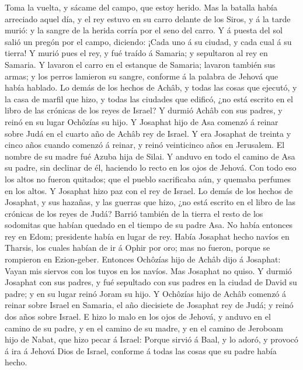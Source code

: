 Toma la vuelta, y sácame del campo, que estoy herido. 
Mas la batalla había arreciado aquel día, y el rey estuvo en su carro
delante de los Siros, y á la tarde murió: y la sangre de la herida
corría por el seno del carro.  Y á puesta del sol salió
un pregón por el campo, diciendo: ¡Cada uno á su ciudad, y cada cual á
su tierra!  Y murió pues el rey, y fué traído á Samaria;
y sepultaron al rey en Samaria.  Y lavaron el carro en el
estanque de Samaria; lavaron también sus armas; y los perros lamieron su
sangre, conforme á la palabra de Jehová que había hablado.
 Lo demás de los hechos de Achâb, y todas las cosas que
ejecutó, y la casa de marfil que hizo, y todas las ciudades que edificó,
¿no está escrito en el libro de las crónicas de los reyes de Israel?
 Y durmió Achâb con sus padres, y reinó en su lugar
Ochôzías su hijo.  Y Josaphat hijo de Asa comenzó á
reinar sobre Judá en el cuarto año de Achâb rey de Israel.
 Y era Josaphat de treinta y cinco años cuando comenzó á
reinar, y reinó veinticinco años en Jerusalem. El nombre de su madre fué
Azuba hija de Silai.  Y anduvo en todo el camino de Asa
su padre, sin declinar de él, haciendo lo recto en los ojos de Jehová.
 Con todo eso los altos no fueron quitados; que el pueblo
sacrificaba aún, y quemaba perfumes en los altos.  Y
Josaphat hizo paz con el rey de Israel.  Lo demás de los
hechos de Josaphat, y sus hazañas, y las guerras que hizo, ¿no está
escrito en el libro de las crónicas de los reyes de Judá?
 Barrió también de la tierra el resto de los sodomitas
que habían quedado en el tiempo de su padre Asa.  No
había entonces rey en Edom; presidente había en lugar de rey.
 Había Josaphat hecho navíos en Tharsis, los cuales
habían de ir á Ophir por oro; mas no fueron, porque se rompieron en
Ezion-geber.  Entonces Ochôzías hijo de Achâb dijo á
Josaphat: Vayan mis siervos con los tuyos en los navíos. Mas Josaphat no
quiso.  Y durmió Josaphat con sus padres, y fué sepultado
con sus padres en la ciudad de David su padre; y en su lugar reinó Joram
su hijo.  Y Ochôzías hijo de Achâb comenzó á reinar sobre
Israel en Samaria, el año diecisiete de Josaphat rey de Judá; y reinó
dos años sobre Israel.  E hizo lo malo en los ojos de
Jehová, y anduvo en el camino de su padre, y en el camino de su madre, y
en el camino de Jeroboam hijo de Nabat, que hizo pecar á Israel: Porque
sirvió á Baal, y lo adoró, y provocó á ira á Jehová Dios de Israel,
conforme á todas las cosas que su padre había hecho.
